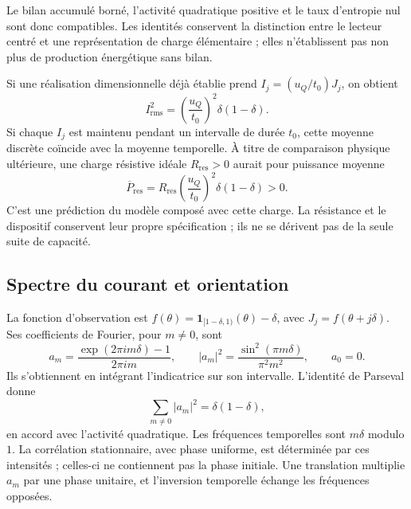 Le bilan accumulé borné, l'activité quadratique positive et le taux d'entropie nul sont donc compatibles. Les identités conservent la distinction entre le lecteur centré et une représentation de charge élémentaire ; elles n'établissent pas non plus de production énergétique sans bilan.

Si une réalisation dimensionnelle déjà établie prend $I_j=(u_Q/t_0)J_j$, on obtient
\begin{equation}
 I_{\mathrm{rms}}^2
 =\left(\frac{u_Q}{t_0}\right)^2\delta(1-\delta).
 \label{md:cron:eficaz}
\end{equation}
Si chaque $I_j$ est maintenu pendant un intervalle de durée $t_0$, cette moyenne discrète coïncide avec la moyenne temporelle. À titre de comparaison physique ultérieure, une charge résistive idéale $R_{\mathrm{res}}>0$ aurait pour puissance moyenne
\begin{equation}
 \overline P_{\mathrm{res}}
 =R_{\mathrm{res}}\left(\frac{u_Q}{t_0}\right)^2
 \delta(1-\delta)>0.
 \label{md:cron:potencia-resistiva}
\end{equation}
C'est une prédiction du modèle composé avec cette charge. La résistance et le dispositif conservent leur propre spécification ; ils ne se dérivent pas de la seule suite de capacité.

\subsection{Spectre du courant et orientation}
\label{md:cron:espectro}

La fonction d'observation est $f(\theta)=\mathbf1_{[1-\delta,1)}(\theta)-\delta$, avec $J_j=f(\theta+j\delta)$. Ses coefficients de Fourier, pour $m\neq0$, sont
\begin{equation}
 a_m=\frac{\exp(2\pi i m\delta)-1}{2\pi i m},\qquad
 |a_m|^2=\frac{\sin^2(\pi m\delta)}{\pi^2m^2},\qquad
 a_0=0.
 \label{md:cron:fourier}
\end{equation}
Ils s'obtiennent en intégrant l'indicatrice sur son intervalle. L'identité de Parseval donne
\begin{equation}
 \sum_{m\neq0}|a_m|^2=\delta(1-\delta),
 \label{md:cron:parseval}
\end{equation}
en accord avec l'activité quadratique. Les fréquences temporelles sont $m\delta$ modulo $1$. La corrélation stationnaire, avec phase uniforme, est déterminée par ces intensités ; celles-ci ne contiennent pas la phase initiale. Une translation multiplie $a_m$ par une phase unitaire, et l'inversion temporelle échange les fréquences opposées.

